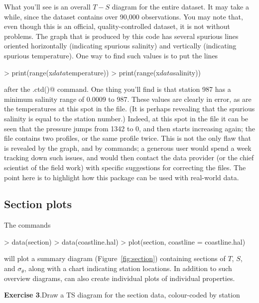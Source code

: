 \documentclass{article}
\newcommand{\workedexercise}[2]{
	\vspace{2ex plus 2ex minus 1ex}
	\begin{boxedminipage}[c]{0.95\linewidth}
		{\textbf{Exercise #1}.\hspace{1em}#2}
	\end{boxedminipage}
	\vspace{2ex plus 2ex minus 1ex}
}
\begin{document}
What you'll see is an overall $T-S$ diagram for the entire dataset. It may take
a while, since the dataset contains over 90,000 observations. You may note that,
even though this is an official, quality-controlled dataset, it is not without
problems. The graph that is produced by this code has several spurious lines
oriented horizontally (indicating spurious salinity) and vertically (indicating
spurious temperature). One way to find such values is to put the lines
\begin{Schunk}
\begin{Sinput}
> print(range(x$data$temperature))
> print(range(x$data$salinity))
\end{Sinput}
\end{Schunk}
after the \verb@read.ctd()@ command. One thing you'll find is that station 987
has a minimum salinity range of 0.0009 to 987. These values are clearly in
error, as are the temperatures at this spot in the file. (It is perhaps
revealing that the spurious salinity is equal to the station number.) Indeed, at
this spot in the file it can be seen that the pressure jumps from 1342 to 0, and
then starts increasing again; the file contains two profiles, or the same
profile twice. This is not the only flaw that is revealed by the graph, and by
\verb@range@ commands; a generous user would spend a week tracking down such
issues, and would then contact the data provider (or the chief scientist of the
field work) with specific suggestions for correcting the files. The point here
is to highlight how this package can be used with real-world data.

\subsection{Section plots}
The commands
\begin{Schunk}
\begin{Sinput}
> data(section)
> data(coastline.hal)
> plot(section, coastline = coastline.hal)
\end{Sinput}
\end{Schunk}
will plot a summary diagram (Figure~\ref{fig:section}) containing sections of
$T$, $S$, and $\sigma_\theta$, along with a chart indicating station
locations. In addition to such overview diagrams, \verb@plot@ can also create
individual plots of individual properties.

\workedexercise{3}{Draw a TS diagram for the section data, colour-coded by station}
\end{document}
